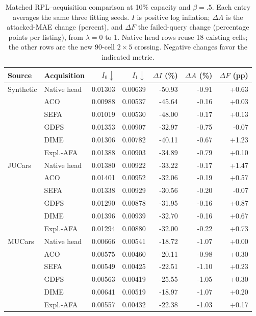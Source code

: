 \documentclass[11pt]{article}
\begin{document}
\begin{table}[tbp]\centering\small
\caption{Matched RPL--acquisition comparison at 10\% capacity and $\beta=.5$. Each entry averages the same three fitting seeds. $I$ is positive log inflation; $\Delta A$ is the attacked-MAE change (percent), and $\Delta F$ the failed-query change (percentage points per listing), from $\lambda=0$ to 1. Native head rows reuse 18 existing cells; the other rows are the new 90-cell $2\times5$ crossing. Negative changes favor the indicated metric.}
\label{tab:rpl_crossing}
\setlength{\tabcolsep}{4pt}
\begin{tabular}{llrrrrr}\toprule
Source & Acquisition & $I_0\downarrow$ & $I_1\downarrow$ & $\Delta I$ (\%) & $\Delta A$ (\%) & $\Delta F$ (pp)\\\midrule
Synthetic & Native head & 0.01303 & 0.00639 & -50.93 & -0.91 & +0.63\\
 & ACO & 0.00988 & 0.00537 & -45.64 & -0.16 & +0.03\\
 & SEFA & 0.01019 & 0.00530 & -48.00 & -0.17 & +0.13\\
 & GDFS & 0.01353 & 0.00907 & -32.97 & -0.75 & -0.07\\
 & DIME & 0.01306 & 0.00782 & -40.11 & -0.67 & +1.23\\
 & Expl.-AFA & 0.01388 & 0.00903 & -34.89 & -0.79 & +0.10\\
\midrule
JUCars & Native head & 0.01380 & 0.00922 & -33.22 & -0.17 & +1.47\\
 & ACO & 0.01401 & 0.00952 & -32.06 & -0.19 & +0.57\\
 & SEFA & 0.01338 & 0.00929 & -30.56 & -0.20 & -0.07\\
 & GDFS & 0.01290 & 0.00878 & -31.95 & -0.16 & +0.87\\
 & DIME & 0.01396 & 0.00939 & -32.70 & -0.16 & +0.67\\
 & Expl.-AFA & 0.01294 & 0.00880 & -32.00 & -0.22 & +0.73\\
\midrule
MUCars & Native head & 0.00666 & 0.00541 & -18.72 & -1.07 & +0.00\\
 & ACO & 0.00575 & 0.00460 & -20.11 & -0.98 & +0.30\\
 & SEFA & 0.00549 & 0.00425 & -22.51 & -1.10 & +0.23\\
 & GDFS & 0.00563 & 0.00419 & -25.55 & -1.05 & +0.30\\
 & DIME & 0.00641 & 0.00519 & -18.97 & -1.07 & +0.20\\
 & Expl.-AFA & 0.00557 & 0.00432 & -22.38 & -1.03 & +0.17\\
\bottomrule\end{tabular}
\end{table}
\end{document}
